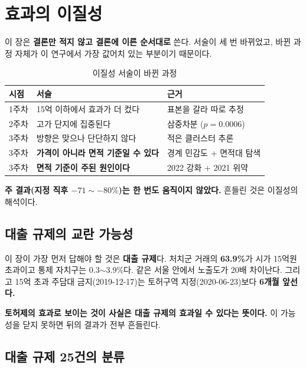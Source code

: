 
\section{효과의 이질성}

이 장은 \textbf{결론만 적지 않고 결론에 이른 순서대로} 쓴다. 서술이 세 번 바뀌었고,
바뀐 과정 자체가 이 연구에서 가장 값어치 있는 부분이기 때문이다.

\begin{table}[htbp]
  \centering
  \caption{이질성 서술이 바뀐 과정}
  \label{tab:het-history}
  \begin{tabular}{llp{7.0cm}}
    \toprule
    \textbf{시점} & \textbf{서술} & \textbf{근거} \\
    \midrule
    1주차 & 15억 이하에서 효과가 더 컸다 & 표본을 갈라 따로 추정 \\
    2주차 & 고가 단지에 집중된다 & 삼중차분 ($p=0.0006$) \\
    3주차 & 방향은 맞으나 단단하지 않다 & 적은 클러스터 추론 \\
    3주차 & \textbf{가격이 아니라 면적 기준일 수 있다} &
      경계 민감도 + 면적대 탐색 \\
    3주차 & \textbf{면적 기준이 주된 원인이다} &
      2022 강화 + 2021 위약 \\
    \bottomrule
  \end{tabular}
\end{table}

\textbf{주 결과(지정 직후 $-71 \sim -80\%$)는 한 번도 움직이지 않았다.} 흔들린
것은 이질성의 해석이다.

\subsection{대출 규제의 교란 가능성}

이 장이 가장 먼저 답해야 할 것은 \textbf{대출 규제}다. 처치군 거래의
\textbf{63.9\%}가 시가 15억원 초과이고 통제 자치구는 0.3$\sim$3.9\%다. 같은 서울
안에서 노출도가 20배 차이난다. 그리고 15억 초과 주담대 금지(2019-12-17)는
토허구역 지정(2020-06-23)보다 \textbf{6개월 앞선다.}

\textbf{토허제의 효과로 보이는 것이 사실은 대출 규제의 효과일 수 있다는 뜻이다.}
이 가능성을 닫지 못하면 뒤의 결과가 전부 흔들린다.

\subsection{대출 규제 25건의 분류}

